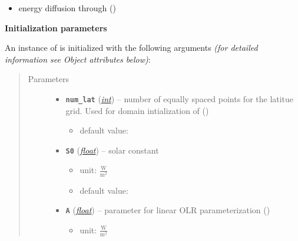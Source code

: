 \documentclass[a4paper,10pt,english]{sphinxmanual}
\begin{document}
\begin{fulllineitems}
\begin{itemize}
\item {} 
energy diffusion through 
{\hyperref[api/climlab.dynamics:climlab.dynamics.diffusion.MeridionalDiffusion]{\emph{}}} ()

\end{itemize}

\textbf{Initialization parameters}

An instance of  is initialized with the following 
arguments \emph{(for detailed information see Object attributes below)}:
\begin{quote}\begin{description}
\item[{Parameters}] \leavevmode\begin{itemize}
\item {} 
\textbf{\texttt{num\_lat}} (\href{http://docs.python.org/2.7/library/functions.html\#int}{\emph{int}}) -- 
number of equally spaced points for the 
latitue grid. Used for domain intialization of
{\hyperref[api/climlab.domain:climlab.domain.domain.zonal_mean_surface]{\emph{}}} ()
\begin{itemize}
\item {} 
default value: 

\end{itemize}


\item {} 
\textbf{\texttt{S0}} (\href{http://docs.python.org/2.7/library/functions.html\#float}{\emph{float}}) -- 
solar constant
\begin{itemize}
\item {} 
unit: \(\frac{\textrm{W}}{\textrm{m}^2}\)

\item {} 
default value: 

\end{itemize}


\item {} 
\textbf{\texttt{A}} (\href{http://docs.python.org/2.7/library/functions.html\#float}{\emph{float}}) -- 
parameter for linear OLR parameterization
{\hyperref[api/climlab.radiation:climlab.radiation.AplusBT.AplusBT]{\emph{}}} ()
\begin{itemize}
\item {} 
unit: \(\frac{\textrm{W}}{\textrm{m}^2}\)


\end{itemize}
\end{itemize}
\end{description}
\end{quote}
\end{fulllineitems}
\end{document}

